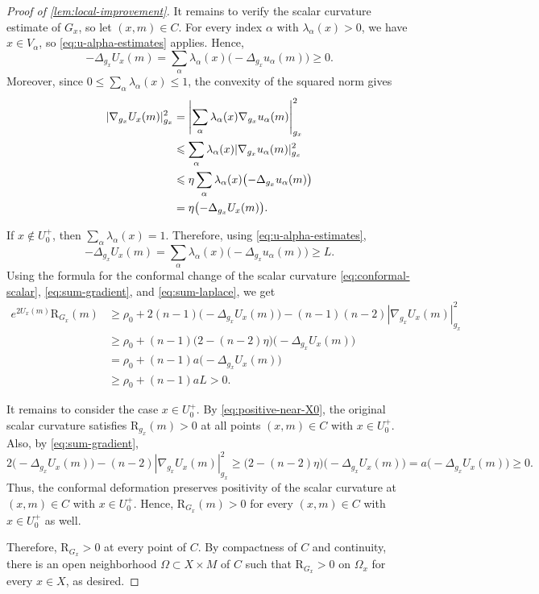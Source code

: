 \documentclass[11pt]{amsart}
\numberwithin{equation}{section}
\newcommand{\scal}{\mathrm{R}}
\let\geq\geqslant
\let\leq\leqslant
\begin{document}
\begin{proof}[Proof of \cref{lem:local-improvement}]
It remains to verify the scalar curvature estimate of $G_x$, so let \((x,m)\in C\). For every index \(\alpha\) with \(\lambda_\alpha(x)>0\), we have
\(x\in V_\alpha\), so \eqref{eq:u-alpha-estimates} applies. Hence,
\[
 -\Delta_{g_x}U_x(m)
 =
 \sum_\alpha\lambda_\alpha(x)\bigl(-\Delta_{g_x}u_\alpha(m)\bigr)
 \geq 0.
\]
Moreover, since \(0\leq\sum_\alpha\lambda_\alpha(x)\leq1\), the convexity of the squared norm gives
\begin{align}\label{eq:sum-gradient}
 |\nabla_{g_x}U_x(m)|_{g_x}^2
 &=
 \left|\sum_\alpha\lambda_\alpha(x)\nabla_{g_x}u_\alpha(m)\right|_{g_x}^2  \\
 &\leq
 \sum_\alpha\lambda_\alpha(x)|\nabla_{g_x}u_\alpha(m)|_{g_x}^2  \notag\\
 &\leq
 \eta\sum_\alpha\lambda_\alpha(x)\bigl(-\Delta_{g_x}u_\alpha(m)\bigr)  \notag\\
 &=
 \eta\bigl(-\Delta_{g_x}U_x(m)\bigr). \notag
\end{align}

If \(x\notin U_0^+\), then \(\sum_\alpha\lambda_\alpha(x)=1\). Therefore, using
\eqref{eq:u-alpha-estimates},
\begin{equation}\label{eq:sum-laplace}
 -\Delta_{g_x}U_x(m)
 =
 \sum_\alpha\lambda_\alpha(x)\bigl(-\Delta_{g_x}u_\alpha(m)\bigr)
 \geq L.
\end{equation}
Using the formula for the conformal change of the scalar curvature \eqref{eq:conformal-scalar}, \eqref{eq:sum-gradient}, and
\eqref{eq:sum-laplace}, we get
\begin{align*}
 e^{2U_x(m)}\scal_{G_x}(m)
 &\geq
 \rho_0
 +2(n-1)\bigl(-\Delta_{g_x}U_x(m)\bigr)
 -(n-1)(n-2)|\nabla_{g_x}U_x(m)|_{g_x}^2  \\
 &\geq
 \rho_0
 +(n-1)\bigl(2-(n-2)\eta\bigr)
 \bigl(-\Delta_{g_x}U_x(m)\bigr) \\
 &=
 \rho_0+(n-1)a\bigl(-\Delta_{g_x}U_x(m)\bigr) \\
 &\geq
 \rho_0+(n-1)aL>0.
\end{align*}

It remains to consider the case \(x\in U_0^+\). By \eqref{eq:positive-near-X0}, the original scalar
curvature satisfies \(\scal_{g_x}(m)>0\) at all points \((x,m)\in C\) with \(x\in U_0^+\). Also, by
\eqref{eq:sum-gradient},
\[
 2\bigl(-\Delta_{g_x}U_x(m)\bigr)
 -(n-2)|\nabla_{g_x}U_x(m)|_{g_x}^2
 \geq
 \bigl(2-(n-2)\eta\bigr)\bigl(-\Delta_{g_x}U_x(m)\bigr)
 =
 a\bigl(-\Delta_{g_x}U_x(m)\bigr)
 \geq 0.
\]
Thus, the conformal deformation preserves positivity of the scalar curvature at
$(x,m)\in C$ with $x\in U_0^+$. Hence, $\scal_{G_x}(m)>0$ for every $(x,m)\in C$ with $x\in U_0^+$ as well.

Therefore, $\scal_{G_x}>0$ at every point of $C$. By compactness of $C$ and continuity, there is an
open neighborhood $\Omega\subset X\times M$ of $C$ such that $\scal_{G_x}>0$ on
$\Omega_x$ for every $x\in X$, as desired. 
\end{proof}
\end{document}
